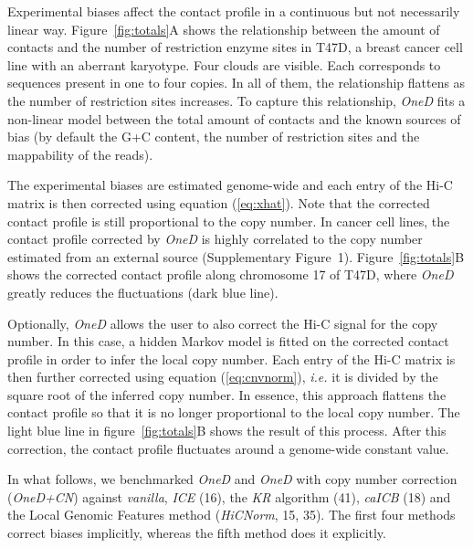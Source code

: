\documentclass[a4,center,fleqn]{NAR}
\providecommand{\DIFadd}[1]{{\protect\color{red}#1}} %
\providecommand{\DIFdel}[1]{{\protect}}                      %
\providecommand{\DIFaddbegin}{} %
\providecommand{\DIFaddend}{} %
\providecommand{\DIFdelbegin}{} %
\providecommand{\DIFdelend}{} %
\begin{document}
Experimental biases affect the contact profile in a continuous but not
necessarily linear way. Figure~\ref{fig:totals}A shows the relationship
between the amount of contacts and the number of restriction enzyme sites
in T47D, a breast cancer cell line with an aberrant karyotype.  Four
clouds are visible. Each corresponds to sequences present in one to four
copies. In all of them, the relationship flattens as the number of
restriction sites increases. To capture this relationship, \textit{OneD}
fits a non-linear model between the total amount of contacts and the known
sources of bias (by default the G+C content, the number of restriction
sites and the mappability of the reads).

The experimental biases are estimated genome-wide and each entry of the
Hi-C matrix is then corrected using equation (\ref{eq:xhat}). Note that
the corrected contact profile is still proportional to the copy number.
In cancer cell lines, the contact profile corrected by \textit{OneD} is
highly correlated to the copy number estimated from an external source
(Supplementary Figure~1). Figure~\ref{fig:totals}B shows the corrected
contact profile along chromosome 17 of T47D, where \textit{OneD} greatly
reduces the fluctuations (dark blue line).

Optionally, \textit{OneD} allows the user to also correct the Hi-C signal
for the copy number. In this case, a hidden Markov model is fitted on the
corrected contact profile in order to infer the local copy number. Each
entry of the Hi-C matrix is then further corrected using equation
(\ref{eq:cnvnorm}), \textit{i.e.} it is divided by the square root of the
inferred copy number. In essence, this approach flattens the contact
profile so that it is no longer proportional to the local copy number. The
light blue line in figure~\ref{fig:totals}B shows the result of this
process. After this correction, the contact profile fluctuates around a
genome-wide constant value.

In what follows, we benchmarked \textit{OneD} and \textit{OneD} with copy
number correction (\textit{OneD+CN}) against \textit{vanilla},
\textit{ICE} (16), the \textit{KR} algorithm
(\DIFdelbegin \DIFdel{38}\DIFdelend \DIFaddbegin \DIFadd{41}\DIFaddend ), \textit{caICB} (18) and the
Local Genomic Features method (\textit{\DIFdelbegin \DIFdel{LGF}\DIFdelend \DIFaddbegin \DIFadd{HiCNorm}\DIFaddend }, 15, \DIFdelbegin \DIFdel{32}\DIFdelend \DIFaddbegin \DIFadd{35}\DIFaddend ). The first four methods correct biases implicitly,
whereas the fifth method does it explicitly.
\end{document}
